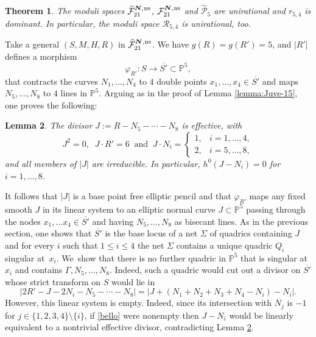 \documentclass[11pt]{article}
\newcommand{\ns}{{\mkern1mu\mathrm{ns}}}
\newcommand{\bN}{\boldsymbol{N}}
\theoremstyle{plain}
\newtheorem{thm}{Theorem}[section]
\newtheorem{lemma}[thm]{Lemma}
\theoremstyle{definition}
\newcommand\PP{{\mathbb P}}
\newcommand\F{{\mathcal F}}
\renewcommand\P{{\mathcal P}}
\newcommand\R{{\mathcal R}}
\begin{document}
\begin{thm}\label{54}
The moduli spaces $\widehat{\F}_{21}^{\bN,\ns}$, $\F_{21}^{\bN,\ns}$ and $\widehat\P_{5}$ are unirational and $r_{5,4}$ is dominant. In particular, the moduli space $\R_{5,4}$ is unirational, too.
\end{thm}

Take a general $(S,M,H,R)$ in $\widehat{\F}_{21}^{\bN,\ns}$.
We have $g(R)=g(R')=5$, and $|R'|$ defines a morphism\vspace*{-3pt}
\[
\varphi_{R'}:S\to \overline{S'}\subset \PP^5,
\]
that contracts the curves $N_1,\ldots,N_4$ to $4$ double points $x_1,\ldots,x_4\in \overline{S'}$ and maps $N_5,\ldots,N_8$ to $4$ lines in $\PP^5$.
Arguing as in the proof of Lemma \ref{lemma:Juve-15}, one proves the following:

\begin{lemma} \label{lemma:Juve-15-2}
The divisor
$J:=R-N_5-\cdots-N_8$
is effective, with\vspace*{-3pt}
\[
 J^2=0, \;\; J\cdot R'=6\;\; \mbox{and} \;\; J \cdot N_i =
\begin{cases}
1, & i=1,\ldots,4, \\
2, & i=5,\ldots,8,
\end{cases}
\]
and all members of $|J|$ are irreducible. In particular, $h^0(J-N_i)=0$ for $i=1,\ldots,8$. 
\end{lemma}

It follows that $|J|$ is a base point free elliptic pencil and that
$\varphi_{R'}$ maps any fixed smooth $J$ in its linear system
to an elliptic normal curve $J\subset \PP^5$ passing through the nodes $x_1,\ldots x_4\in \overline{S'}$ and having $N_5,\ldots,N_8$ as bisecant lines. As in the previous section, one shows that $\overline{S'}$ is the base locus of a net $\Sigma$ of quadrics containing $J$ and for every $i$ such that $1\leq i\leq 4$ the net $\Sigma$ contains a unique quadric $Q_i$ singular at~$x_i$. We~show that there is no further quadric in $\PP^5$ that is singular at $x_i$ and contains $\Gamma,N_5,\ldots,N_8$. Indeed, such a quadric would cut out a divisor on $\overline{S'}$ whose strict transform on $S$ would lie in
\begin{equation}\label{bello} |2R'-J-2N_i-N_5-\cdots -N_8|=|J+(N_1+N_2+N_3+N_4-N_i)-N_i |.
\end{equation}
However, this linear system is empty. Indeed, since its intersection with $N_j$ is $-1$ for $j \in \{1,2,3,4\} \setminus \{i\}$, if \eqref{bello} were nonempty then
$J-N_i$ would be linearly equivalent to a nontrivial effective divisor, contradicting Lemma \ref{lemma:Juve-15-2}.
\end{document}
